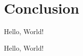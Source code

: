 \documentclass[acmlarge]{acmart}
\begin{document}
\section{Conclusion}

Hello, World!

\begin{acks}

Hello, World!

\end{acks}



\end{document}
